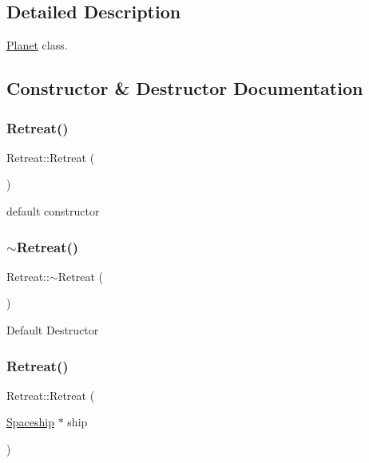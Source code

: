 \subsection{Detailed Description}
\hyperlink{classPlanet}{Planet} class. 

\subsection{Constructor \& Destructor Documentation}
\mbox{\label{classRetreat_a889d73ed4b9fcdf13cfa986145d8763a}} 
\subsubsection{\texorpdfstring{Retreat()}{Retreat()}\hspace{0.1cm}{\footnotesize\ttfamily [1/2]}}
{\footnotesize\ttfamily Retreat\+::\+Retreat (\begin{DoxyParamCaption}{ }\end{DoxyParamCaption})}

default constructor \mbox{\label{classRetreat_af14f96d3b46f7757511442c01f20edd9}} 
\subsubsection{\texorpdfstring{$\sim$\+Retreat()}{~Retreat()}}
{\footnotesize\ttfamily Retreat\+::$\sim$\+Retreat (\begin{DoxyParamCaption}{ }\end{DoxyParamCaption})}

Default Destructor \mbox{\label{classRetreat_ab748f69c4ed3552908789bc18c73f917}} 
\subsubsection{\texorpdfstring{Retreat()}{Retreat()}\hspace{0.1cm}{\footnotesize\ttfamily [2/2]}}
{\footnotesize\ttfamily Retreat\+::\+Retreat (\begin{DoxyParamCaption}\item[{\hyperlink{classSpaceship}{Spaceship} $\ast$}]{ship }\end{DoxyParamCaption})\hspace{0.3cm}{\ttfamily [inline]}}


